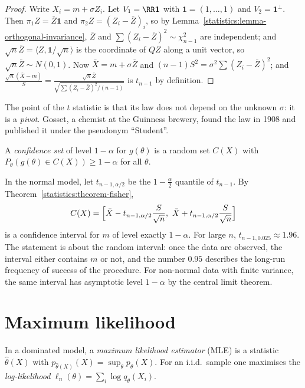 \begin{proof}
Write $X_i = m + \sigma Z_i$. Let $V_1 = \RR\mathbf{1}$ with $\mathbf{1} = (1, \ldots, 1)$ and $V_2 = \mathbf{1}^\perp$. Then $\pi_1Z = \bar Z\mathbf{1}$ and $\pi_2Z = (Z_i - \bar Z)_i$, so by Lemma~\ref{statistics:lemma-orthogonal-invariance},
$\bar Z$ and $\sum(Z_i - \bar Z)^2 \sim \chi^2_{n-1}$ are independent; and $\sqrt n\bar Z = \langle Z, \mathbf{1}/\sqrt n\rangle$ is the coordinate of $QZ$ along a unit vector, so $\sqrt n\bar Z \sim N(0, 1)$. Now $\bar X = m + \sigma\bar Z$ and
$(n - 1)S^2 = \sigma^2\sum(Z_i - \bar Z)^2$; and $\frac{\sqrt n(\bar X - m)}{S} = \frac{\sqrt n\bar Z}{\sqrt{\sum(Z_i - \bar Z)^2/(n - 1)}}$ is $t_{n-1}$ by definition.
\end{proof}

The point of the $t$ statistic is that its law does not depend on the unknown $\sigma$: it is a \emph{pivot}. Gosset, a chemist at the Guinness brewery, found the law in 1908 and published it under the pseudonym ``Student''.

\begin{definition}\label{statistics:definition-confidence}
A \emph{confidence set} of level $1 - \alpha$ for $g(\theta)$ is a random set $C(X)$ with $P_\theta(g(\theta) \in C(X)) \geq 1 - \alpha$ for all $\theta$.
\end{definition}

\begin{example}\label{statistics:example-confidence}
In the normal model, let $t_{n-1, \alpha/2}$ be the $1 - \frac\alpha2$ quantile of $t_{n-1}$. By Theorem~\ref{statistics:theorem-fisher},
\[
C(X) = \Bigl[\bar X - t_{n-1,\alpha/2}\frac{S}{\sqrt n},\ \bar X + t_{n-1,\alpha/2}\frac{S}{\sqrt n}\Bigr]
\]
is a confidence interval for $m$ of level exactly $1 - \alpha$. For large $n$, $t_{n-1, 0.025} \approx 1.96$. The statement is about the random interval: once the data are observed, the interval either contains $m$ or not, and
the number $0.95$ describes the long-run frequency of success of the procedure. For non-normal data with finite variance, the same interval has asymptotic level $1 - \alpha$ by the central limit theorem.
\end{example}

\section{Maximum likelihood}\label{statistics:section-maximum-likelihood}

\begin{definition}\label{statistics:definition-mle}
In a dominated model, a \emph{maximum likelihood estimator} (MLE) is a statistic $\hat\theta(X)$ with $p_{\hat\theta(X)}(X) = \sup_\theta p_\theta(X)$. For an i.i.d.\ sample one maximises the \emph{log-likelihood}
$\ell_n(\theta) = \sum_i\log q_\theta(X_i)$.
\end{definition}

